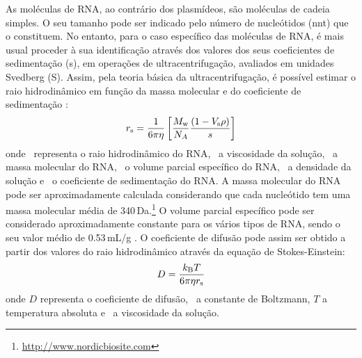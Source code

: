 As moléculas de RNA, ao contrário dos plasmídeos, são moléculas de cadeia simples. O seu tamanho pode ser indicado pelo número de nucleótidos (nnt) que o constituem. No entanto, para o caso específico das moléculas de RNA, é mais usual proceder à sua identificação através dos valores dos seus coeficientes de sedimentação (s), em operações de ultracentrifugação, avaliados em unidades Svedberg (S). Assim, pela teoria básica da ultracentrifugação, é possível estimar o raio hidrodinâmico em função da massa molecular e do coeficiente de sedimentação \cite{voet,beckman}:
\begin{equation}
\label{eq:ultracentri_pra}
r_{\mathrm{s}}=\frac{1}{6\pi\eta}\left[ \frac{M_\mathrm{w}}{N_{A}}\frac{(1-V_{\mathrm{s}}\rho)}{s}\right]
\end{equation}%
%
%
%
%
%
%
onde \raiostokes\ representa o raio hidrodinâmico do RNA, \viscosidade\ a viscosidade da solução, \massamolecular\ a massa molecular do RNA, \volumeparcial\ o volume parcial específico do RNA, \densidade\ a densidade da solução e \sedimentacao\ o coeficiente de sedimentação do RNA. A massa molecular do RNA pode ser aproximadamente calculada considerando que cada nucleótido tem uma massa molecular média de 340\,Da.\footnote{\url{http://www.nordicbiosite.com}} O volume parcial específico pode ser considerado aproximadamente constante para os vários tipos de RNA, sendo o seu valor médio de 0.53\,mL/g \cite{beckman}. O coeficiente de difusão pode assim ser obtido a partir dos valores do raio hidrodinâmico através da equação de Stokes-Einstein:
\begin{equation}
\label{eq:stokes_einstein_pra}
D=\frac{k_{\mathrm{B}} T}{6\pi\eta r_{\mathrm{s}}}
\end{equation}
onde $D$ representa o coeficiente de difusão, \boltzman\ a constante de Boltzmann, $T$ a temperatura absoluta e \viscosidade\ a viscosidade da solução.

